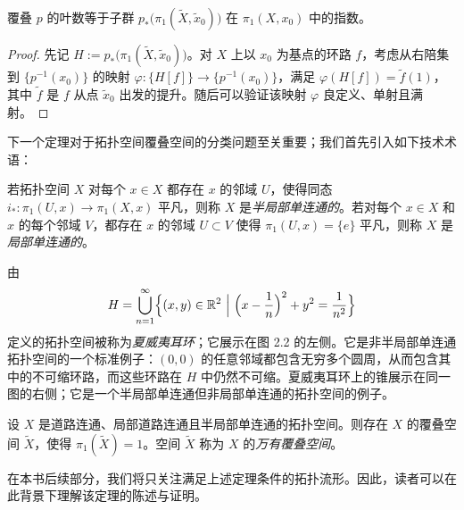 \begin{proposition}[2.6]
覆叠 $p$ 的叶数等于子群 $p_*\bigl(\pi_1(\tilde X,\tilde x_0)\bigr)$ 在 $\pi_1(X,x_0)$ 中的指数。
\end{proposition}

\begin{proof}
先记 $H:=p_*\bigl(\pi_1(\tilde X,\tilde x_0)\bigr)$。对 $X$ 上以 $x_0$ 为基点的环路 $f$，考虑从右陪集到 $\{p^{-1}(x_0)\}$ 的映射 $\varphi\colon\{H[f]\}\to\{p^{-1}(x_0)\}$，满足 $\varphi(H[f])=\tilde f(1)$，其中 $\tilde f$ 是 $f$ 从点 $\tilde x_0$ 出发的提升。随后可以验证该映射 $\varphi$ 良定义、单射且满射。
\end{proof}

下一个定理对于拓扑空间覆叠空间的分类问题至关重要；我们首先引入如下技术术语：

\begin{definition}[2.7]
若拓扑空间 $X$ 对每个 $x\in X$ 都存在 $x$ 的邻域 $U$，使得同态 $i_*\colon\pi_1(U,x)\to\pi_1(X,x)$ 平凡，则称 $X$ 是\emph{半局部单连通的}。若对每个 $x\in X$ 和 $x$ 的每个邻域 $V$，都存在 $x$ 的邻域 $U\subset V$ 使得 $\pi_1(U,x)=\{e\}$ 平凡，则称 $X$ 是\emph{局部单连通的}。
\end{definition}


由
\[
H=\bigcup_{n=1}^{\infty}\Bigl\{(x,y)\in\R^2\ \Big|\ \Bigl(x-\frac{1}{n}\Bigr)^2+y^2=\frac{1}{n^2}\Bigr\}
\]
定义的拓扑空间被称为\emph{夏威夷耳环}；它展示在图 2.2 的左侧。它是非半局部单连通拓扑空间的一个标准例子：$(0,0)$ 的任意邻域都包含无穷多个圆周，从而包含其中的不可缩环路，而这些环路在 $H$ 中仍然不可缩。夏威夷耳环上的锥展示在同一图的右侧；它是一个半局部单连通但非局部单连通的拓扑空间的例子。


\begin{theorem}[2.8]
设 $X$ 是道路连通、局部道路连通且半局部单连通的拓扑空间。则存在 $X$ 的覆叠空间 $\tilde X$，使得 $\pi_1(\tilde X)=1$。空间 $\tilde X$ 称为 $X$ 的\emph{万有覆叠空间}。
\end{theorem}

\begin{remark}[2.9]
在本书后续部分，我们将只关注满足上述定理条件的拓扑流形。因此，读者可以在此背景下理解该定理的陈述与证明。
\end{remark}

